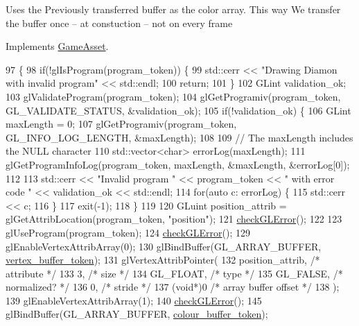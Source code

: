 Uses the Previously transferred buffer as the color array. This way We transfer the buffer once -- at constuction -- not on every frame

Implements \hyperlink{classGameAsset_a961aa51ca0a9961fc584c0b5d5431300}{Game\+Asset}.


\begin{DoxyCode}
97                                            \{
98   \textcolor{keywordflow}{if}(!glIsProgram(program\_token)) \{
99     std::cerr << \textcolor{stringliteral}{"Drawing Diamon with invalid program"} << std::endl;
100     \textcolor{keywordflow}{return};
101   \}
102   GLint validation\_ok;
103   glValidateProgram(program\_token);
104   glGetProgramiv(program\_token, GL\_VALIDATE\_STATUS, &validation\_ok);
105   \textcolor{keywordflow}{if}(!validation\_ok) \{
106     GLint maxLength = 0;
107     glGetProgramiv(program\_token, GL\_INFO\_LOG\_LENGTH, &maxLength);
108 
109     \textcolor{comment}{// The maxLength includes the NULL character}
110     std::vector<char> errorLog(maxLength);
111     glGetProgramInfoLog(program\_token, maxLength, &maxLength, &errorLog[0]);
112 
113     std::cerr << \textcolor{stringliteral}{"Invalid program "} << program\_token << \textcolor{stringliteral}{" with error code "} << validation\_ok << std::endl;
114     \textcolor{keywordflow}{for}(\textcolor{keyword}{auto} c: errorLog) \{
115       std::cerr << c;
116     \}
117     exit(-1);
118   \}
119 
120   GLuint position\_attrib = glGetAttribLocation(program\_token, \textcolor{stringliteral}{"position"});
121   \hyperlink{LeavesAsset_8cc_a75f201b0e53e68726854997957322b8d}{checkGLError}();
122 
123   glUseProgram(program\_token);
124   \hyperlink{LeavesAsset_8cc_a75f201b0e53e68726854997957322b8d}{checkGLError}();
129   glEnableVertexAttribArray(0);
130   glBindBuffer(GL\_ARRAY\_BUFFER, \hyperlink{classLeavesAsset_a360df8eb2239e2f4ed069522d0de7629}{vertex\_buffer\_token});
131   glVertexAttribPointer(
132     position\_attrib,        \textcolor{comment}{/* attribute */}
133     3,        \textcolor{comment}{/* size */}
134     GL\_FLOAT,   \textcolor{comment}{/* type */}
135     GL\_FALSE,   \textcolor{comment}{/* normalized? */}
136     0,        \textcolor{comment}{/* stride */}
137     (\textcolor{keywordtype}{void}*)0    \textcolor{comment}{/* array buffer offset */}
138   );
139   glEnableVertexAttribArray(1);
140   \hyperlink{LeavesAsset_8cc_a75f201b0e53e68726854997957322b8d}{checkGLError}();
145   glBindBuffer(GL\_ARRAY\_BUFFER, \hyperlink{classLeavesAsset_a7e586bea0f5a80b9a262f11e31a5faac}{colour\_buffer\_token});

\end{DoxyCode}
